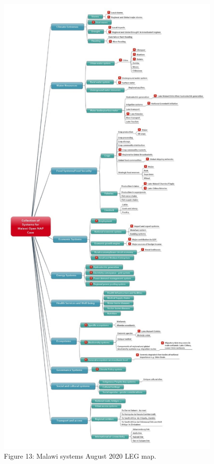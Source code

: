 \documentclass[
]{book}
\begin{document}
\begin{figure}
\centering
\includegraphics{images/LEG_map.jpg}
\caption{Figure 13: Malawi systems August 2020 LEG map.}
\end{figure}
\end{document}
